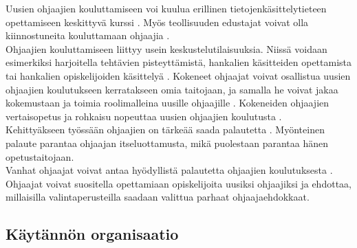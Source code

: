 \documentclass[finnish]{tktltiki2}
\theoremstyle{definition}
\theoremstyle{remark}
\begin{document}
Uusien ohjaajien kouluttamiseen voi kuulua erillinen tietojenkäsittelytieteen opettamiseen keskittyvä kurssi \cite{Reges88, Roberts95}.  Myös teollisuuden edustajat voivat olla kiinnostuneita kouluttamaan ohjaajia \cite{Morgan02}.
\\
Ohjaajien kouluttamiseen liittyy usein keskustelutilaisuuksia. Niissä voidaan esimerkiksi harjoitella tehtävien pisteyttämistä, hankalien käsitteiden opettamista tai hankalien opiskelijoiden käsittelyä \cite{Reges03}. Kokeneet ohjaajat voivat osallistua uusien ohjaajien koulutukseen kerratakseen omia taitojaan, ja samalla he voivat jakaa kokemustaan ja toimia roolimalleina uusille ohjaajille \cite{Reges88}. Kokeneiden ohjaajien vertaisopetus ja rohkaisu nopeuttaa uusien ohjaajien koulutusta \cite{Decker06}.
\\
Kehittyäkseen työssään ohjaajien on tärkeää saada palautetta \cite{Patitsas12}. Myönteinen palaute parantaa ohjaajan itseluottamusta, mikä puolestaan parantaa hänen opetustaitojaan.
\\
Vanhat ohjaajat voivat antaa hyödyllistä palautetta ohjaajien koulutuksesta \cite{Decker06}. Ohjaajat voivat suositella opettamiaan opiskelijoita uusiksi ohjaajiksi ja ehdottaa, millaisilla valintaperusteilla saadaan valittua parhaat ohjaajaehdokkaat. 



\subsection{Käytännön organisaatio}
\end{document}
